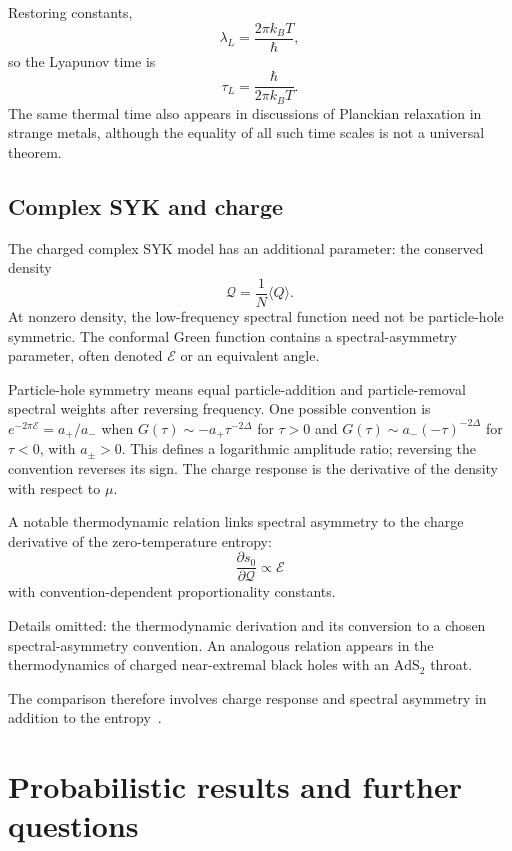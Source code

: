 \documentclass[11pt]{article}
\numberwithin{equation}{section}
\theoremstyle{exposition}
\theoremstyle{result}
\newcommand{\AdS}{\mathrm{AdS}}
\begin{document}
Restoring constants,
\begin{equation*}
\lambda_L=\frac{2\pi k_BT}{\hbar},
\end{equation*}
so the Lyapunov time is
\begin{equation*}
\tau_L=\frac{\hbar}{2\pi k_BT}.
\end{equation*}
The same thermal time also appears in discussions of Planckian relaxation in strange metals, although the equality of all such time scales is not a universal theorem.

\subsection{Complex SYK and charge}

The charged complex SYK model has an additional parameter: the conserved density
\begin{equation*}
\mathcal Q=\frac1N\langle Q\rangle.
\end{equation*}
At nonzero density, the low-frequency spectral function need not be particle-hole symmetric. The conformal Green function contains a spectral-asymmetry parameter, often denoted $\mathcal E$ or an equivalent angle.


Particle-hole symmetry means equal particle-addition and particle-removal spectral weights after reversing frequency. One possible convention is $e^{-2\pi\mathcal E}=a_+/a_-$ when $G(\tau)\sim-a_+\tau^{-2\Delta}$ for $\tau>0$ and $G(\tau)\sim a_-(-\tau)^{-2\Delta}$ for $\tau<0$, with $a_\pm>0$. This defines a logarithmic amplitude ratio; reversing the convention reverses its sign. The charge response is the derivative of the density with respect to $\mu$.

A notable thermodynamic relation links spectral asymmetry to the charge derivative of the zero-temperature entropy:
\begin{equation*}
\frac{\partial s_0}{\partial \mathcal Q}
\propto \mathcal E
\end{equation*}
with convention-dependent proportionality constants.

Details omitted: the thermodynamic derivation and its conversion to a chosen spectral-asymmetry convention. An analogous relation appears in the thermodynamics of charged near-extremal black holes with an $\AdS_2$ throat.

The comparison therefore involves charge response and spectral asymmetry in addition to the entropy~\cite{SachdevBH,SachdevReview}.

\section[Probability and further questions]{Probabilistic results and further questions}\label{sec:probability}
\end{document}
